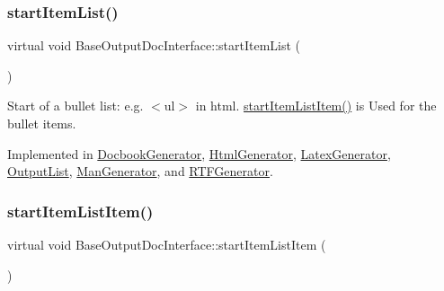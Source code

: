 \mbox{\label{class_base_output_doc_interface_a54b169393594b6cf113977ccccaeb9ee}} 
\subsubsection{\texorpdfstring{startItemList()}{startItemList()}}
{\footnotesize\ttfamily virtual void Base\+Output\+Doc\+Interface\+::start\+Item\+List (\begin{DoxyParamCaption}{ }\end{DoxyParamCaption})\hspace{0.3cm}{\ttfamily [pure virtual]}}

Start of a bullet list\+: e.\+g. {\ttfamily $<$ul$>$} in html. \mbox{\hyperlink{class_base_output_doc_interface_aa1cbcadfedf8e6d52029d17526b5fa3f}{start\+Item\+List\+Item()}} is Used for the bullet items. 

Implemented in \mbox{\hyperlink{class_docbook_generator_addaf6b46396259a8bbebe7b1e9716bc0}{Docbook\+Generator}}, \mbox{\hyperlink{class_html_generator_aedec2c1429139e4fd713df22e5636879}{Html\+Generator}}, \mbox{\hyperlink{class_latex_generator_a19bab2ba8d61d4a574805610d1a639e6}{Latex\+Generator}}, \mbox{\hyperlink{class_output_list_a1677b65eb8f01a10b1d767758338a212}{Output\+List}}, \mbox{\hyperlink{class_man_generator_a5b29aa8c2dd69237fd7470df129fc4e3}{Man\+Generator}}, and \mbox{\hyperlink{class_r_t_f_generator_a277db06db2dc29602f3209ca899111c9}{R\+T\+F\+Generator}}.

\mbox{\label{class_base_output_doc_interface_aa1cbcadfedf8e6d52029d17526b5fa3f}} 
\subsubsection{\texorpdfstring{startItemListItem()}{startItemListItem()}}
{\footnotesize\ttfamily virtual void Base\+Output\+Doc\+Interface\+::start\+Item\+List\+Item (\begin{DoxyParamCaption}{ }\end{DoxyParamCaption})\hspace{0.3cm}{\ttfamily [pure virtual]}}

